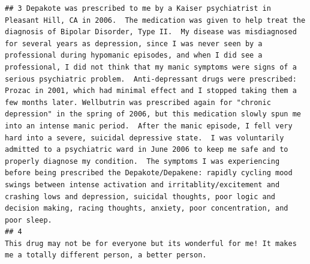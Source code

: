 \documentclass[spanish,]{article}
\begin{document}
\begin{verbatim}
## 3 Depakote was prescribed to me by a Kaiser psychiatrist in Pleasant Hill, CA in 2006.  The medication was given to help treat the diagnosis of Bipolar Disorder, Type II.  My disease was misdiagnosed for several years as depression, since I was never seen by a professional during hypomanic episodes, and when I did see a professional, I did not think that my manic symptoms were signs of a serious psychiatric problem.  Anti-depressant drugs were prescribed: Prozac in 2001, which had minimal effect and I stopped taking them a few months later. Wellbutrin was prescribed again for "chronic depression" in the spring of 2006, but this medication slowly spun me into an intense manic period.  After the manic episode, I fell very hard into a severe, suicidal depressive state.  I was voluntarily admitted to a psychiatric ward in June 2006 to keep me safe and to properly diagnose my condition.  The symptoms I was experiencing before being prescribed the Depakote/Depakene: rapidly cycling mood swings between intense activation and irritablity/excitement and crashing lows and depression, suicidal thoughts, poor logic and decision making, racing thoughts, anxiety, poor concentration, and poor sleep.
## 4                                                                                                                                                                                                                                                                                                                                                                                                                                                                                                                                                                                                                                                                                                                                                                                                                                                                                                                                                                                                                                                                                                                              This drug may not be for everyone but its wonderful for me! It makes me a totally different person, a better person.

\end{verbatim}
\end{document}
